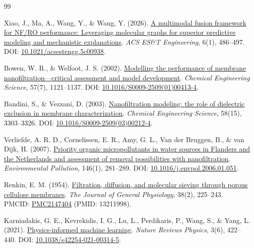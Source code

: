 \documentclass[11pt]{article}
\begin{document}
\newpage

\begin{thebibliography}{99}

 Xiao, J., Ma, A., Wang, Y., \& Wang, Y. (2026). \href{https://doi.org/10.1021/acsestengg.5c00938}{A multimodal fusion framework for NF/RO performance: Leveraging molecular graphs for superior predictive modeling and mechanistic explanations}. \textit{ACS ES\&T Engineering}, 6(1), 486--497. DOI: \href{https://doi.org/10.1021/acsestengg.5c00938}{10.1021/acsestengg.5c00938}.

 Bowen, W. R., \& Welfoot, J. S. (2002). \href{https://doi.org/10.1016/S0009-2509(01)00413-4}{Modelling the performance of membrane nanofiltration---critical assessment and model development}. \textit{Chemical Engineering Science}, 57(7), 1121--1137. DOI: \href{https://doi.org/10.1016/S0009-2509(01)00413-4}{10.1016/S0009-2509(01)00413-4}.

 Bandini, S., \& Vezzani, D. (2003). \href{https://doi.org/10.1016/S0009-2509(03)00212-4}{Nanofiltration modeling: the role of dielectric exclusion in membrane characterization}. \textit{Chemical Engineering Science}, 58(15), 3303--3326. DOI: \href{https://doi.org/10.1016/S0009-2509(03)00212-4}{10.1016/S0009-2509(03)00212-4}.

 Verliefde, A. R. D., Cornelissen, E. R., Amy, G. L., Van der Bruggen, B., \& van Dijk, H. (2007). \href{https://doi.org/10.1016/j.envpol.2006.01.051}{Priority organic micropollutants in water sources in Flanders and the Netherlands and assessment of removal possibilities with nanofiltration}. \textit{Environmental Pollution}, 146(1), 281--289. DOI: \href{https://doi.org/10.1016/j.envpol.2006.01.051}{10.1016/j.envpol.2006.01.051}.

 Renkin, E. M. (1954). \href{https://pmc.ncbi.nlm.nih.gov/articles/PMC2147404/}{Filtration, diffusion, and molecular sieving through porous cellulose membranes}. \textit{The Journal of General Physiology}, 38(2), 225--243. PMCID: \href{https://pmc.ncbi.nlm.nih.gov/articles/PMC2147404/}{PMC2147404} (PMID: 13211998).

 Karniadakis, G. E., Kevrekidis, I. G., Lu, L., Perdikaris, P., Wang, S., \& Yang, L. (2021). \href{https://doi.org/10.1038/s42254-021-00314-5}{Physics-informed machine learning}. \textit{Nature Reviews Physics}, 3(6), 422--440. DOI: \href{https://doi.org/10.1038/s42254-021-00314-5}{10.1038/s42254-021-00314-5}.


\end{thebibliography}
\end{document}
